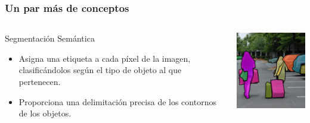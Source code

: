 \begin{frame}
    \frametitle{Un par más de conceptos}

    \begin{columns}
    \begin{block}{Segmentación Semántica}
        \begin{itemize}
            \item Asigna una etiqueta a cada píxel de la imagen, clasificándolos según el tipo de objeto al que pertenecen.
            \item Proporciona una delimitación precisa de los contornos de los objetos.
        \end{itemize}
    \end{block}
    \begin{center}
        \includegraphics[width=5.5cm]{Figuras/Img05.png}
    \end{center}
    \end{columns}
    
\end{frame}
